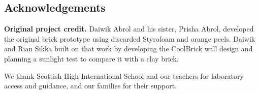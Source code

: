 \documentclass[11pt,a4paper]{article}
\begin{document}
\subsection{Acknowledgements}
\textbf{Original project credit.} Daiwik Abrol and his sister, Prisha Abrol,
developed the original brick prototype using discarded Styrofoam and orange
peels. Daiwik and Rian Sikka built on that work by developing the CoolBrick
wall design and planning a sunlight test to compare it with a clay brick.

We thank Scottish High International School and our teachers for laboratory
access and guidance, and our families for their support.
\end{document}
